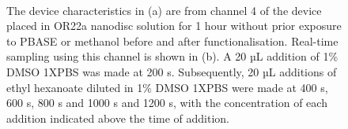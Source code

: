 \documentclass[
  a4paper,
]{scrbook}
\begin{document}
\begin{figure}
\begin{minipage}[t]{0.46\linewidth}
{{}

}

\end{minipage}%
%
\begin{minipage}[t]{0.03\linewidth}

{\centering 

~

}

\end{minipage}%
%
\begin{minipage}[t]{0.03\linewidth}

{\centering 


}

\end{minipage}%
%
\begin{minipage}[t]{0.46\linewidth}

{\centering 


}

\end{minipage}%

\caption{\label{fig-OR22a-variability-TX-comparison}The device
characteristics in (a) are from channel 4 of the device placed in OR22a
nanodisc solution for 1 hour without prior exposure to PBASE or methanol
before and after functionalisation. Real-time sampling using this
channel is shown in (b). A 20 µL addition of 1\% DMSO 1XPBS was made at
200 s. Subsequently, 20 µL additions of ethyl hexanoate diluted in 1\%
DMSO 1XPBS were made at 400 s, 600 s, 800 s and 1000 s and 1200 s, with
the concentration of each addition indicated above the time of
addition.}

\end{figure}
\end{document}

